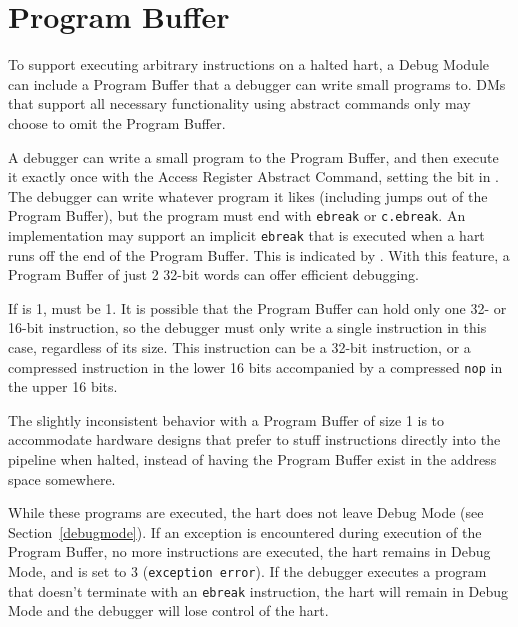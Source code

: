 

\section{Program Buffer} \label{programbuffer}

To support executing arbitrary instructions on a halted hart,
a Debug Module can include a Program Buffer that a debugger
can write small programs to. DMs
that support all necessary functionality using abstract commands
only may choose to omit the Program Buffer.

A debugger can write a small program to the Program Buffer, and then
execute it exactly once with the Access Register Abstract Command,
setting the \FacAccessregisterPostexec bit in \RdmCommand.
The debugger can write whatever program it likes (including jumps out of the
Program Buffer), but the program must end with
{\tt ebreak} or {\tt c.ebreak}. An implementation may support
an implicit {\tt ebreak} that is executed when a hart runs off the end of the
Program Buffer. This is indicated by \FdmDmstatusImpebreak. With this feature, a Program
Buffer of just 2 32-bit words can offer efficient debugging.

If \FdmAbstractcsProgbufsize is 1, \FdmDmstatusImpebreak must be 1. It is possible that the Program
Buffer can hold only one 32- or 16-bit instruction, so the debugger must only
write a single instruction in this case, regardless of its size.
This instruction can be a 32-bit
instruction, or a compressed instruction in the lower 16 bits accompanied by a
compressed {\tt nop} in the upper 16 bits.

\begin{commentary}
    The slightly inconsistent behavior with a Program Buffer of size 1 is to
    accommodate hardware designs that prefer to stuff instructions directly
    into the pipeline when halted, instead of having the Program Buffer exist
    in the address space somewhere.
\end{commentary}

While these programs are executed, the hart does not leave Debug Mode (see
Section~\ref{debugmode}).  If an exception is encountered during execution of
the Program Buffer, no more instructions are executed, the hart remains in Debug
Mode, and \FdmAbstractcsCmderr is set to 3 ({\tt exception error}).  If the debugger
executes a program that doesn't terminate with an {\tt ebreak} instruction, the
hart will remain in Debug Mode and the debugger will lose control of the hart.

